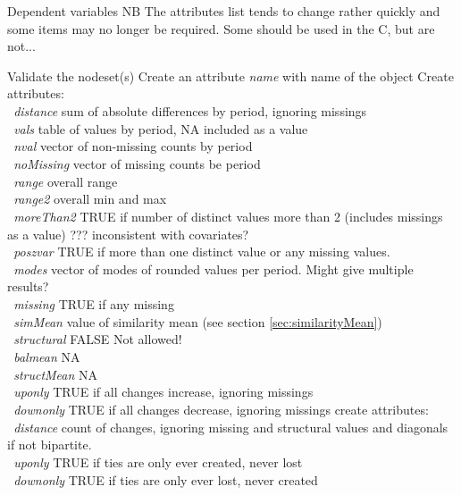 \documentclass[12pt,a4paper]{article}
\makeatletter
\renewcommand{\=}{\,=\,}
\newcommand{\+}{\,+\,}
\newcommand{\nnm}[1]{\textsf{\small\textit{#1}}}
\renewcommand{\subsection}{\@startsection{subsection}{2}
                {0pt}{0.7\baselineskip}{0.3\baselineskip}
                {\sffamily} }
\newcommand{\sfn}[1]{\textbf{\texttt{#1}}}
\makeatother
\begin{document}
\subsection{Dependent variables}
\label{sec:dependent}
NB The attributes list tends to change rather quickly and some items may no
longer be required. Some should be used in the C, but are not...
\begin{algorithmic}
\STATE Validate the nodeset(s)
\STATE Create an attribute \nnm{name} with name of the object
\STATE Create attributes:\\
\sfn{ }\nnm{distance} sum of absolute differences by period, ignoring missings\\
\sfn{ }\nnm{vals} table of values by period, NA included as a value\\
\sfn{ }\nnm{nval} vector of non-missing counts by period\\
\sfn{ }\nnm{noMissing} vector of missing counts be period\\
\sfn{ }\nnm{range} overall range\\
\sfn{ }\nnm{range2} overall min and max\\
\sfn{ }\nnm{moreThan2} TRUE if number of distinct values more than 2 (includes
missings as a value) ??? inconsistent with covariates?\\
\sfn{ }\nnm{poszvar} TRUE if more than one distinct value or any missing
values.\\
\sfn{ }\nnm{modes} vector of modes of rounded values per period. Might give
multiple results?\\
\sfn{ }\nnm{missing} TRUE if any missing\\
\sfn{ }\nnm{simMean} value of similarity mean (see section
\ref{sec:similarityMean})\\
\sfn{ }\nnm{structural} FALSE Not allowed!\\
\sfn{ }\nnm{balmean} NA\\
\sfn{ }\nnm{structMean} NA\\
\sfn{ }\nnm{uponly} TRUE if all changes increase, ignoring missings\\
\sfn{ }\nnm{downonly} TRUE if all changes decrease, ignoring missings
\STATE create attributes:\\
\sfn{ }\nnm{distance} count of changes, ignoring missing and structural values
and diagonals if not bipartite.\\
\sfn{ }\nnm{uponly} TRUE if ties are only ever created, never lost\\
\sfn{ }\nnm{downonly} TRUE if ties are only ever lost, never created\\

\end{algorithmic}
\end{document}
